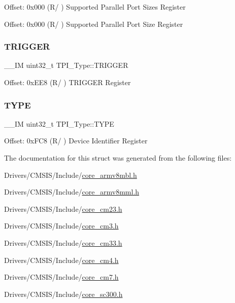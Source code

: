 Offset\+: 0x000 (R/ ) Supported Parallel Port Sizes Register

Offset\+: 0x000 (R/ ) Supported Parallel Port Size Register \mbox{\label{struct_t_p_i___type_a4d4cd2357f72333a82a1313228287bbd}} 
\subsubsection{\texorpdfstring{TRIGGER}{TRIGGER}}
{\footnotesize\ttfamily \+\_\+\+\_\+\+IM uint32\+\_\+t T\+P\+I\+\_\+\+Type\+::\+T\+R\+I\+G\+G\+ER}

Offset\+: 0x\+E\+E8 (R/ ) T\+R\+I\+G\+G\+ER Register \mbox{\label{struct_t_p_i___type_a01972f64f408cec28320780ca067b142}} 
\subsubsection{\texorpdfstring{TYPE}{TYPE}}
{\footnotesize\ttfamily \+\_\+\+\_\+\+IM uint32\+\_\+t T\+P\+I\+\_\+\+Type\+::\+T\+Y\+PE}

Offset\+: 0x\+F\+C8 (R/ ) Device Identifier Register 

The documentation for this struct was generated from the following files\+:\begin{DoxyCompactItemize}
\item 
Drivers/\+C\+M\+S\+I\+S/\+Include/\mbox{\hyperlink{core__armv8mbl_8h}{core\+\_\+armv8mbl.\+h}}\item 
Drivers/\+C\+M\+S\+I\+S/\+Include/\mbox{\hyperlink{core__armv8mml_8h}{core\+\_\+armv8mml.\+h}}\item 
Drivers/\+C\+M\+S\+I\+S/\+Include/\mbox{\hyperlink{core__cm23_8h}{core\+\_\+cm23.\+h}}\item 
Drivers/\+C\+M\+S\+I\+S/\+Include/\mbox{\hyperlink{core__cm3_8h}{core\+\_\+cm3.\+h}}\item 
Drivers/\+C\+M\+S\+I\+S/\+Include/\mbox{\hyperlink{core__cm33_8h}{core\+\_\+cm33.\+h}}\item 
Drivers/\+C\+M\+S\+I\+S/\+Include/\mbox{\hyperlink{core__cm4_8h}{core\+\_\+cm4.\+h}}\item 
Drivers/\+C\+M\+S\+I\+S/\+Include/\mbox{\hyperlink{core__cm7_8h}{core\+\_\+cm7.\+h}}\item 
Drivers/\+C\+M\+S\+I\+S/\+Include/\mbox{\hyperlink{core__sc300_8h}{core\+\_\+sc300.\+h}}\end{DoxyCompactItemize}

